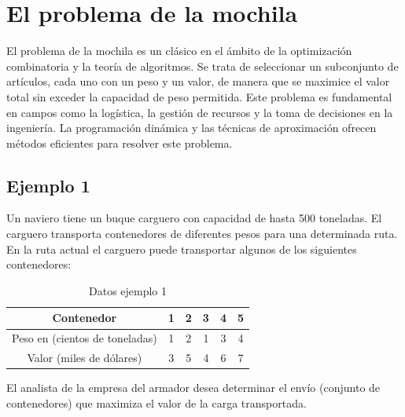 
\section{El problema de la mochila}
El problema de la mochila es un clásico en el ámbito de la optimización combinatoria y la teoría de algoritmos. Se trata de seleccionar un subconjunto de artículos, cada uno con un peso y un valor, de manera que se maximice el valor total sin exceder la capacidad de peso permitida. Este problema es fundamental en campos como la logística, la gestión de recursos y la toma de decisiones en la ingeniería. La programación dinámica y las técnicas de aproximación ofrecen métodos eficientes para resolver este problema.

\subsection{Ejemplo 1}
Un naviero tiene un buque carguero con capacidad de hasta 500 toneladas. El carguero transporta contenedores de diferentes pesos para una determinada ruta. En la ruta actual el carguero puede transportar algunos de los siguientes contenedores:

\begin{table}[h!]
\centering
\begin{tabular}{|c|c|c|c|c|c|}
\hline
Contenedor & 1 & 2 & 3 & 4 & 5 \\
\hline
Peso en (cientos de toneladas) & 1 & 2 & 1 & 3 & 4 \\
\hline
Valor (miles de dólares) & 3 & 5 & 4 & 6 & 7 \\
\hline
\end{tabular}
\caption{Datos ejemplo 1}
\end{table}

El analista de la empresa del armador desea determinar el envío (conjunto de contenedores) que maximiza el valor de la carga transportada.

